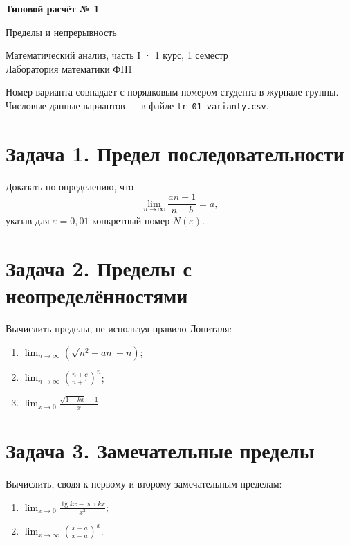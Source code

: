 \documentclass[12pt, a4paper]{article}
\begin{document}
\begin{center}
  {\large\bfseries Типовой расчёт № 1}

  \vspace{0.3em}
  {\large Пределы и непрерывность}

  \vspace{0.5em}
  {\small Математический анализ, часть I · 1 курс, 1 семестр\\
  Лаборатория математики ФН1}
\end{center}

\vspace{1em}

\noindent
Номер варианта совпадает с порядковым номером студента в журнале группы.
Числовые данные вариантов — в файле \texttt{tr-01-varianty.csv}.

\section*{Задача 1. Предел последовательности}

Доказать по определению, что
\[
\lim_{n\to\infty}\frac{a n + 1}{n + b} = a,
\]
указав для $\varepsilon = 0{,}01$ конкретный номер $N(\varepsilon)$.

\section*{Задача 2. Пределы с неопределённостями}

Вычислить пределы, не используя правило Лопиталя:
\begin{enumerate}[label={\asbuk{enumi})}]
  \item $\displaystyle\lim_{n\to\infty}\left(\sqrt{n^2 + an} - n\right)$;
  \item $\displaystyle\lim_{n\to\infty}\left(\frac{n + c}{n + 1}\right)^{n}$;
  \item $\displaystyle\lim_{x\to 0}\frac{\sqrt{1 + kx} - 1}{x}$.
\end{enumerate}

\section*{Задача 3. Замечательные пределы}

Вычислить, сводя к первому и второму замечательным пределам:
\begin{enumerate}[label={\asbuk{enumi})}]
  \item $\displaystyle\lim_{x\to 0}\frac{\operatorname{tg} kx - \sin kx}{x^3}$;
  \item $\displaystyle\lim_{x\to\infty}\left(\frac{x + a}{x - a}\right)^{x}$.
\end{enumerate}
\end{document}
